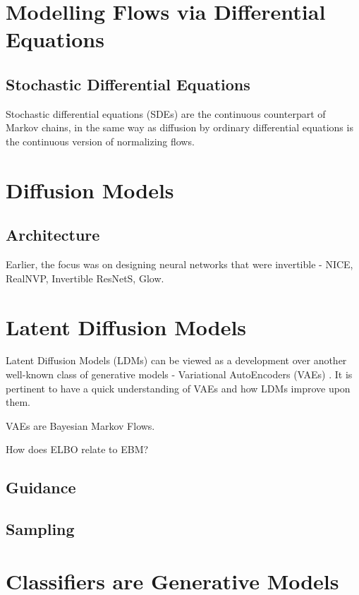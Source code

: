 \documentclass[a4paper, 11pt]{article}
\begin{document}
\section{Modelling Flows via Differential Equations}

\subsection{Stochastic Differential Equations}
Stochastic differential equations (SDEs) are the continuous counterpart of Markov chains, in the same way
as diffusion by ordinary differential equations is the continuous version of normalizing flows.

\section{Diffusion Models}


\subsection{Architecture}
Earlier, the focus was on designing neural networks that were invertible - NICE, RealNVP, Invertible ResNetS, Glow.

\section{Latent Diffusion Models}

Latent Diffusion Models (LDMs) can be viewed as a development over another well-known class of generative models - Variational AutoEncoders (VAEs) \cite{dieleman2023perspectives}. It is pertinent to have a quick understanding of VAEs and how LDMs improve upon them.

VAEs are Bayesian Markov Flows.

How does ELBO relate to EBM?



\subsection{Guidance}

\subsection{Sampling}


\section{Classifiers are Generative Models}
\end{document}

